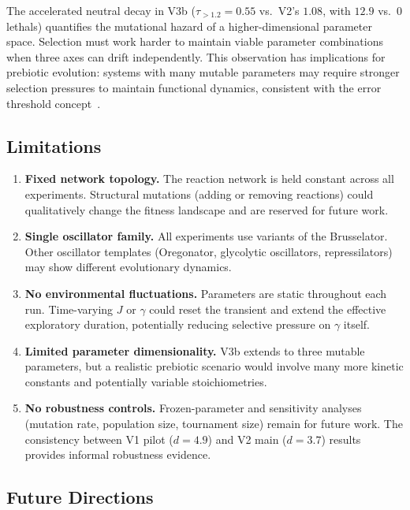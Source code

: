 \documentclass[twocolumn,showpacs,preprintnumbers,amsmath,amssymb,prd,floatfix]{revtex4-2}
\newcommand{\tauexp}{\tau_{>1.2}}
\begin{document}
The accelerated neutral decay in V3b ($\tauexp = 0.55$ vs.\ V2's $1.08$, with $12.9$ vs.\ $0$ lethals) quantifies the mutational hazard of a higher-dimensional parameter space. Selection must work harder to maintain viable parameter combinations when three axes can drift independently. This observation has implications for prebiotic evolution: systems with many mutable parameters may require stronger selection pressures to maintain functional dynamics, consistent with the error threshold concept~\cite{eigen1971}.

\subsection{Limitations}

\begin{enumerate}
\item \textbf{Fixed network topology.} The reaction network is held constant across all experiments. Structural mutations (adding or removing reactions) could qualitatively change the fitness landscape and are reserved for future work.

\item \textbf{Single oscillator family.} All experiments use variants of the Brusselator. Other oscillator templates (Oregonator, glycolytic oscillators, repressilators) may show different evolutionary dynamics.

\item \textbf{No environmental fluctuations.} Parameters are static throughout each run. Time-varying $J$ or $\gamma$ could reset the transient and extend the effective exploratory duration, potentially reducing selective pressure on $\gamma$ itself.

\item \textbf{Limited parameter dimensionality.} V3b extends to three mutable parameters, but a realistic prebiotic scenario would involve many more kinetic constants and potentially variable stoichiometries.

\item \textbf{No robustness controls.} Frozen-parameter and sensitivity analyses (mutation rate, population size, tournament size) remain for future work. The consistency between V1 pilot ($d = 4.9$) and V2 main ($d = 3.7$) results provides informal robustness evidence.
\end{enumerate}

\subsection{Future Directions}
\end{document}
